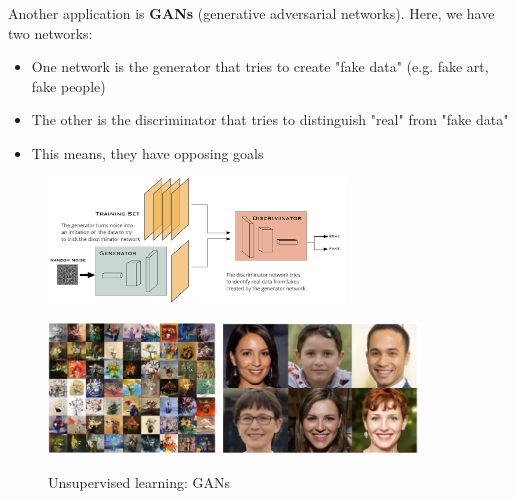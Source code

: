 Another application is \textbf{GANs} (generative adversarial networks). Here, we have two networks:
\begin{itemize}
  \item One network is the generator that tries to create "fake data" (e.g. fake art, fake people)
  \item The other is the discriminator that tries to distinguish "real" from "fake data"
  \item This means, they have opposing goals
\end{itemize}

\begin{figure}[H]
  \centering
  \includegraphics[width=0.7\textwidth]{assets/nn/bb__gan.png}

  \vspace*{0.5cm}
  \includegraphics[height=3.5cm]{assets/nn/bb__gan_res.png}
  \hspace*{0.5cm}
  \includegraphics[height=3.5cm]{assets/nn/bb__gan_res_2.png}
  
  \caption{Unsupervised learning: GANs}
  \label{fig:6_bb_gan}
\end{figure}

